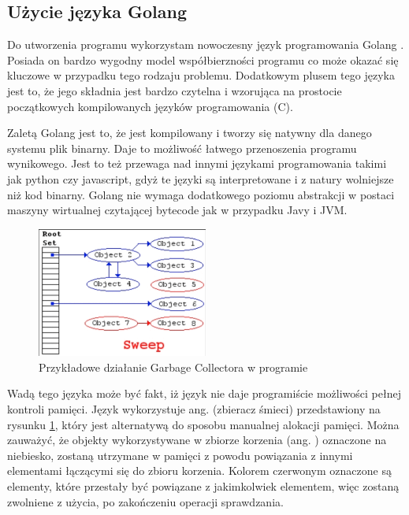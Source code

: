\subsection{Użycie języka Golang}

Do utworzenia programu wykorzystam nowoczesny język programowania Golang \cite{bib:internet:golang}.
Posiada on bardzo wygodny model współbierzności programu co może okazać się 
kluczowe w przypadku tego rodzaju problemu. Dodatkowym plusem tego języka jest
to, że jego składnia jest bardzo czytelna i wzorująca na prostocie początkowych
kompilowanych języków programowania (C).

Zaletą Golang jest to, że jest kompilowany i tworzy się natywny dla danego 
systemu plik binarny. Daje to możliwość łatwego przenoszenia programu wynikowego.
Jest to też przewaga nad innymi językami programowania takimi jak python czy
javascript, gdyż te języki są interpretowane i z natury wolniejsze niż kod 
binarny. Golang nie wymaga dodatkowego poziomu abstrakcji w postaci maszyny 
wirtualnej czytającej bytecode jak w przypadku Javy i JVM.

\begin{figure}[h]
\centering
\includegraphics[width=0.5\textwidth]{./images/GarbageCollector.png}
\caption{Przykładowe działanie Garbage Collectora w programie}
\label{fig:GarbageCollectorImage}
\end{figure}

Wadą tego języka może być fakt, iż język nie daje programiście możliwości pełnej
kontroli pamięci. Język wykorzystuje ang.  (zbieracz 
śmieci) przedstawiony na rysunku \ref{fig:GarbageCollectorImage}, który jest 
alternatywą do sposobu manualnej alokacji pamięci. Można zauważyć, że objekty
wykorzystywane w zbiorze korzenia (ang. ) oznaczone na 
niebiesko, zostaną utrzymane w pamięci z powodu powiązania z innymi elementami
łączącymi się do zbioru korzenia. Kolorem czerwonym oznaczone są elementy, które
przestały być powiązane z jakimkolwiek elementem, więc zostaną zwolniene z 
użycia, po zakończeniu operacji sprawdzania. 

